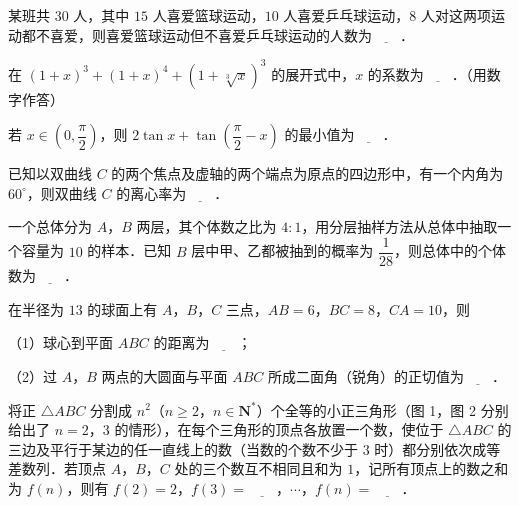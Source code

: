 \begin{question}
某班共 $30$ 人，其中 $15$ 人喜爱篮球运动，$10$ 人喜爱乒乓球运动，$8$ 人对这两项运动都不喜爱，则喜爱篮球运动但不喜爱乒乓球运动的人数为$\underline{\qquad}$．

\end{question}
\begin{question}
在 $(1+x)^3+(1+x)^4+(1+\sqrt[3]{x})^3$ 的展开式中，$x$ 的系数为$\underline{\qquad}$．（用数字作答）

\end{question}
\begin{question}
若 $x\in\left(0,\dfrac\pi2\right)$，则 $2\tan x+\tan\left(\dfrac\pi2-x\right)$ 的最小值为$\underline{\qquad}$．

\end{question}
\begin{question}
已知以双曲线 $C$ 的两个焦点及虚轴的两个端点为原点的四边形中，有一个内角为 $60^\circ$，则双曲线 $C$ 的离心率为$\underline{\qquad}$．

\end{question}
\begin{question}
一个总体分为 $A$，$B$ 两层，其个体数之比为 $4:1$，用分层抽样方法从总体中抽取一个容量为 $10$ 的样本．已知 $B$ 层中甲、乙都被抽到的概率为 $\dfrac1{28}$，则总体中的个体数为$\underline{\qquad}$．

\end{question}
\begingroup
\renewenvironment{question}{\Needspace{0.5\textheight}}{}
\begin{question}
在半径为 $13$ 的球面上有 $A$，$B$，$C$ 三点，$AB=6$，$BC=8$，$CA=10$，则

（1）球心到平面 $ABC$ 的距离为$\underline{\qquad}$；

（2）过 $A$，$B$ 两点的大圆面与平面 $ABC$ 所成二面角（锐角）的正切值为$\underline{\qquad}$．

\Needspace{0.4\textheight}
\end{question}
\endgroup
\begin{question}
将正 $\triangle ABC$ 分割成 $n^2$（$n\geqslant2$，$n\in\mathbf N^*$）个全等的小正三角形（图 1，图 2 分别给出了 $n=2$，$3$ 的情形），在每个三角形的顶点各放置一个数，使位于 $\triangle ABC$ 的三边及平行于某边的任一直线上的数（当数的个数不少于 $3$ 时）都分别依次成等差数列．若顶点 $A$，$B$，$C$ 处的三个数互不相同且和为 $1$，记所有顶点上的数之和为 $f(n)$，则有 $f(2)=2$，$f(3)=\underline{\qquad}$，$\cdots$，$f(n)=\underline{\qquad}$．
\nopagebreak[4]
\begin{center}\end{center}
\nopagebreak[4]
\end{question}

